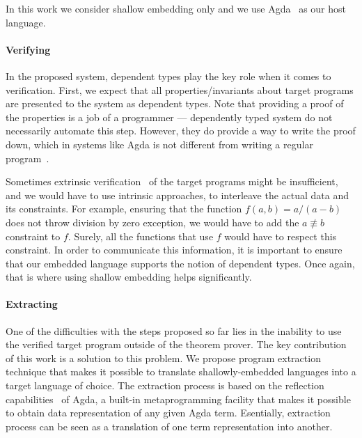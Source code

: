 \documentclass[acmsmall,review,anonymous]{acmart}\settopmatter{printfolios=true,printccs=false,printacmref=false}
\begin{document}
In this work we consider shallow embedding only and we use Agda~\cite{} as our
host language.

\paragraph{Verifying} In the proposed system, dependent types play the key role
when it comes to verification.  First, we expect that all properties/invariants
about target programs are presented to the system as dependent types.  Note that
providing a proof of the properties is a job of a programmer --- dependently
typed system do not necessarily automate this step.  However, they do provide a
way to write the proof down, which in systems like Agda is not different from
writing a regular program~\cite{}.

Sometimes extrinsic verification~\cite{} of the target programs might be
insufficient, and we would have to use intrinsic approaches, \ie{} to interleave
the actual data and its constraints.  For example, ensuring that the function
$f(a, b) = a / (a - b)$ does not throw division by zero exception, we would have
to add the $a \nequiv b$ constraint to $f$.  Surely, all the functions that use
$f$ would have to respect this constraint.  In order to communicate this information,
it is important to ensure that our embedded language supports the notion of
dependent types.  Once again, that is where using shallow embedding helps
significantly.

\paragraph{Extracting}
One of the difficulties with the steps proposed so far lies in the inability
to use the verified target program outside of the theorem prover.  The key
contribution of this work is a solution to this problem.  We propose program extraction
technique that makes it possible to translate shallowly-embedded languages into
a target language of choice.  The extraction process is based on the reflection
capabilities~\cite{} of Agda, \ie{} a built-in metaprogramming facility that makes
it possible to obtain data representation of any given Agda term.  Esentially,
extraction process can be seen as a translation of one term representation
into another.
\end{document}
